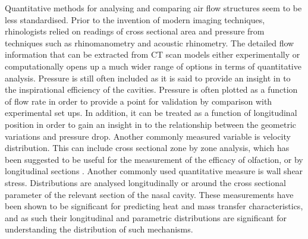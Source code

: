 Quantitative methods for analysing and comparing air flow structures seem to be less standardised. Prior to the invention of modern imaging techniques, rhinologists relied on readings of cross sectional area and pressure from techniques such as rhinomanometry and acoustic rhinometry\cite{Doorly2008c}. The detailed flow information that can be extracted from CT scan models either experimentally or computationally opens up a much wider range of options in terms of quantitative analysis. Pressure is still often included as it is said to provide an insight in to the inspirational efficiency of the cavities\cite{Lintermann2013}. Pressure is often plotted as a function of flow rate in order to provide a point for validation by comparison with experimental set ups\cite{Wen2008, Inthavong2014}. In addition, it can be treated as a function of longitudinal position in order to gain an insight in to the relationship between the geometric variations and pressure drop\cite{Lintermann2013}. Another commonly measured variable is velocity distribution\cite{Keyhani1995, Zhu2011, Lintermann2013}. This can include cross sectional zone by zone analysis\cite{Keyhani1995, Zhu2011}, which has been suggested to be useful for the measurement of the efficacy of olfaction\cite{Zhu2011}, or by longitudinal sections\cite{Lintermann2013,Taylor2010} . Another commonly used quantitative measure is wall shear stress. Distributions are analysed longitudinally\cite{Wen2008} or around the cross sectional parameter of the relevant section of the nasal cavity\cite{Burgos2014}. These measurements have been shown to be significant for predicting heat and mass transfer characteristics\cite{Taylor2010}, and as such their longitudinal and parametric distributions are significant for understanding the distribution of such mechanisms.
 
